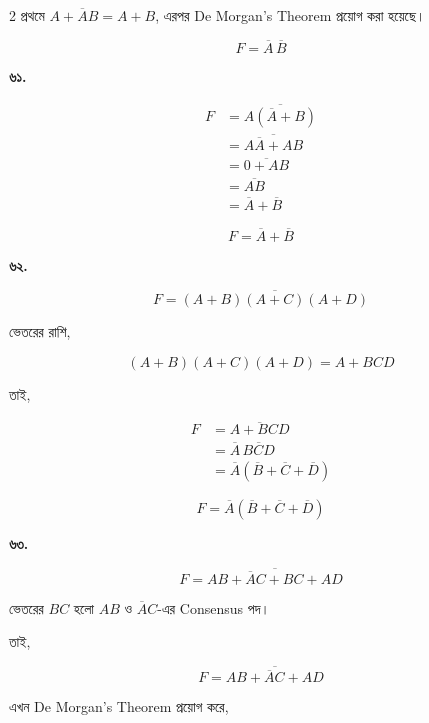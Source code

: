 \begin{multicols}{2}
{\footnotesize
প্রথমে \(A+\overline AB=A+B\),
এরপর \textenglish{De Morgan's Theorem} প্রয়োগ করা হয়েছে।
}

\[
\boxed{F=\overline A\,\overline B}
\]

\medskip


\textbf{৬১.}

\[
\begin{aligned}
F
&=\overline{A(\overline A+B)}\\
&=\overline{A\overline A+AB}\\
&=\overline{0+AB}\\
&=\overline{AB}\\
&=\overline A+\overline B
\end{aligned}
\]

\[
\boxed{F=\overline A+\overline B}
\]

\medskip


\textbf{৬২.}

\[
F=\overline{(A+B)(A+C)(A+D)}
\]

ভেতরের রাশি,

\[
(A+B)(A+C)(A+D)=A+BCD
\]

তাই,

\[
\begin{aligned}
F
&=\overline{A+BCD}\\
&=\overline A\,\overline{BCD}\\
&=\overline A
(\overline B+\overline C+\overline D)
\end{aligned}
\]

\[
\boxed{
F=\overline A
(\overline B+\overline C+\overline D)
}
\]

\medskip


\textbf{৬৩.}

\[
F=
\overline{AB+\overline AC+BC+AD}
\]

ভেতরের \(BC\) হলো \(AB\) ও \(\overline AC\)-এর
\textenglish{Consensus} পদ।

তাই,

\[
F=\overline{AB+\overline AC+AD}
\]

এখন \textenglish{De Morgan's Theorem} প্রয়োগ করে,


\end{multicols}
